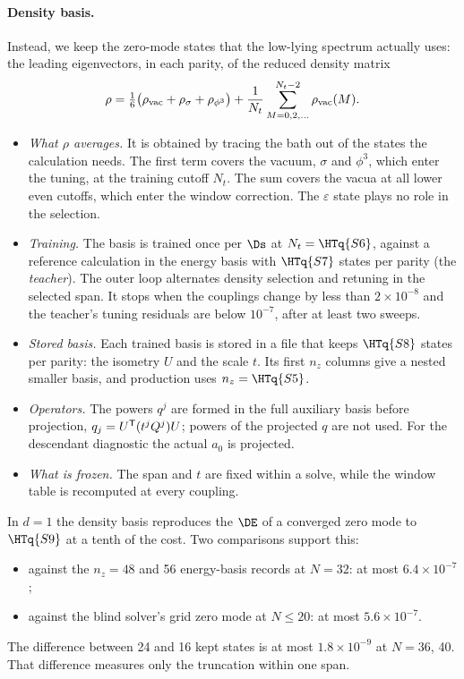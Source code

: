 \paragraph{Density basis.} Instead, we keep the zero-mode states that the low-lying spectrum actually uses: the
leading eigenvectors, in each parity, of the reduced density matrix
\begin{equation}
 \rho=\tfrac16\big(\rho_{\rm vac}+\rho_\sigma+\rho_{\phi^3}\big)+\frac1{N_t}\sum_{M=0,2,\dots}^{N_t-2}\rho_{\rm vac}(M).
 \label{eq:rho}
\end{equation}
\begin{itemize}
\item \emph{What $\rho$ averages.} It is obtained by tracing the bath out of the states the calculation needs. The
 first term covers the vacuum, $\sigma$ and $\phi^3$, which enter the tuning, at the training cutoff $N_t$. The sum
 covers the vacua at all lower even cutoffs, which enter the window correction. The $\varepsilon$ state plays no
 role in the selection.
\item \emph{Training.} The basis is trained once per $\Ds$ at $N_t=\HTq{S6}$, against a reference calculation in
 the energy basis with $\HTq{S7}$ states per parity (the \emph{teacher}). The outer loop alternates density
 selection and retuning in the selected span. It stops when the couplings change by less than $2\times10^{-8}$ and
 the teacher's tuning residuals are below $10^{-7}$, after at least two sweeps.
\item \emph{Stored basis.} Each trained basis is stored in a file that keeps $\HTq{S8}$ states per parity: the
 isometry $U$ and the scale $t$. Its first $n_z$ columns give a nested smaller basis, and production uses
 $n_z=\HTq{S5}$.
\item \emph{Operators.} The powers $q^j$ are formed in the full auxiliary basis before projection,
 $q_j=U^{\sf T}(t^jQ^j)U$; powers of the projected $q$ are not used. For the descendant diagnostic the actual $a_0$
 is projected.
\item \emph{What is frozen.} The span and $t$ are fixed within a solve, while the window table is recomputed at every
 coupling.
\end{itemize}

In $d=1$ the density basis reproduces the $\DE$ of a converged zero mode to $\HTq{S9}$ at a tenth of the cost. Two comparisons
support this:
\begin{itemize}
\item against the $n_z=48$ and 56 energy-basis records at $N=32$: at most $6.4\times10^{-7}$;
\item against the blind solver's grid zero mode at $N\le20$: at most $5.6\times10^{-7}$.
\end{itemize}
The difference between 24 and 16 kept states is at most $1.8\times10^{-9}$ at $N=36$, 40. That difference measures
only the truncation within one span.

